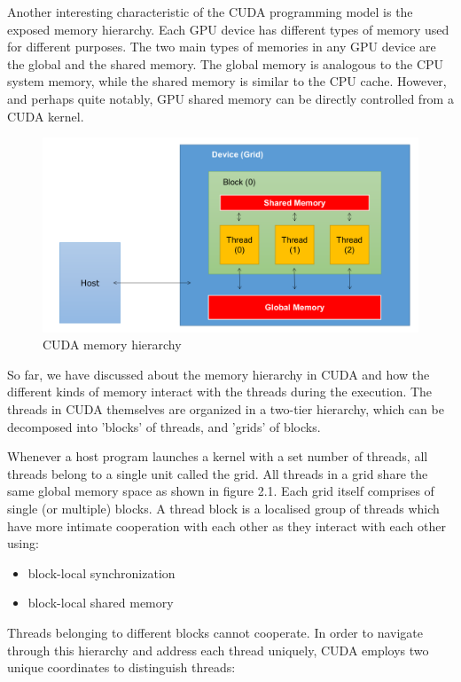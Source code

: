 Another interesting characteristic of the CUDA programming model is the exposed memory hierarchy. Each GPU device has different types of memory used for different purposes. The two main types of memories in any GPU device are the global and the shared memory. The global memory is analogous to the CPU system memory, while the shared memory is similar to the CPU cache. However, and perhaps quite notably, GPU shared memory can be directly controlled from a CUDA kernel.


\begin{figure}[ht]
	\centering
	\includegraphics[scale=0.30]{Pictures/ch2/cuda_mem_hierarchy.png}
	\caption{\small CUDA memory hierarchy}
\end{figure}


So far, we have discussed about the memory hierarchy in CUDA and how the different kinds of memory interact with the threads during the execution. The threads in CUDA themselves are organized in a two-tier hierarchy, which can be decomposed into 'blocks' of threads, and 'grids' of blocks.

Whenever a host program launches a kernel with a set number of threads, all threads belong to a single unit called the grid. All threads in a grid share the same global memory space as shown in figure 2.1. Each grid itself comprises of single (or multiple) blocks. A thread block is a localised group of threads which have more intimate cooperation with each other as they interact with each other using:

\begin{itemize}
    \item block-local synchronization
    \item block-local shared memory
\end{itemize}

Threads belonging to different blocks cannot cooperate. 
In order to navigate through this hierarchy and address each thread uniquely, CUDA employs two unique coordinates to distinguish threads:

